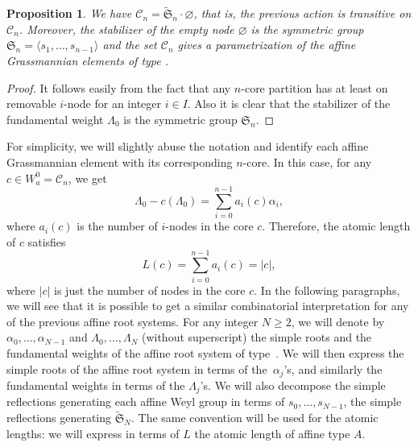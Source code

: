 \documentclass[pdftex]{sigma}
\newtheorem{Proposition}[Theorem]{Proposition}
 { \theoremstyle{definition}
\newtheorem{Definition}[Theorem]{Definition}
\newtheorem{Note}[Theorem]{Note}
\newtheorem{Example}[Theorem]{Example}
\newtheorem{Remark}[Theorem]{Remark} }
\numberwithin{equation}{section}
\begin{document}
\begin{Proposition}
We have $\mathcal{C}_{n}=\widetilde{\mathfrak{S}}_{n}\cdot \varnothing $, that is, the previous action is transitive on $\mathcal{C}_{n}$. Moreover, the
stabilizer of the empty node $\varnothing $ is the symmetric group $\mathfrak{S%
}_{n}=\langle s_{1},\dots ,s_{n-1}\rangle $ and the set $\mathcal{C}_{n}$
gives a parametrization of the affine Grassmannian elements of type .
\end{Proposition}

\begin{proof}
	It follows easily from the fact that any $n$-core partition has at least on removable $i$-node for an integer $i \in I$.
	Also it is clear that the stabilizer of the fundamental weight $\Lambda_0$ is the symmetric group $\mathfrak{S}_{n}$.
\end{proof}

For simplicity, we will slightly abuse the notation and identify each affine
Grassmannian element with its corresponding $n$-core. In this case, for
any $c\in W_{a}^{0}=\mathcal{C}_{n}$, we get
\begin{equation}
\Lambda _{0}-c(\Lambda _{0})=\sum_{i=0}^{n-1}a_{i}(c)\alpha _{i},
\label{DelaAffineA}
\end{equation}
where $a_{i}(c)$ is the number of $i$-nodes in the core $c$. Therefore, the
atomic length of $c$ satisfies
\begin{equation*}
L(c)=\sum_{i=0}^{n-1}a_{i}(c)=\vert c \vert,
\end{equation*}%
where $\vert c \vert $ is just the number of nodes in the core $c$. In the following paragraphs, we will see that it is possible to get a
similar combinatorial interpretation for any of the previous affine root
systems. For any integer $N\geq 2$, we will denote by $\alpha _{0},\dots,\alpha _{N-1}$ and $\Lambda _{0},\dots ,\Lambda _{N}$ (without
superscript) the simple roots and the fundamental weights of the affine root
system of type~. We will then express the simple roots
 of the affine root system  in terms
of the~$\alpha _{j}$'s, and similarly the fundamental weights  in terms of the $\Lambda _{j}$'s. We will also decompose
the simple reflections generating each affine Weyl group 
in terms of $s_{0},\dots ,s_{N-1}$, the simple reflections generating $%
\widetilde{\mathfrak{S}}_{N}$. The same convention will be used for the
atomic lengths: we will express  in terms of $L$ the atomic
length of affine type $A$.
\end{document}
